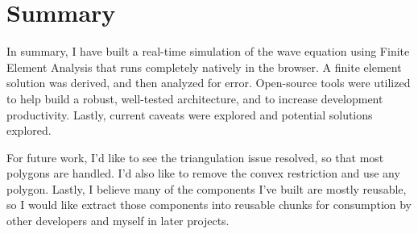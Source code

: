 \section{Summary}
In summary, I have built a real-time simulation of the wave equation using Finite Element Analysis that runs completely
natively in the browser. A finite element solution was derived, and then analyzed for error. Open-source tools were
utilized to help build a robust, well-tested architecture, and to increase development productivity. Lastly, current
caveats were explored and potential solutions explored.

For future work, I'd like to see the triangulation issue resolved, so that most polygons are handled. I'd also like to
remove the convex restriction and use any polygon. Lastly, I believe many of the components I've built are mostly reusable,
so I would like extract those components into reusable chunks for consumption by other developers and myself in later
projects.

